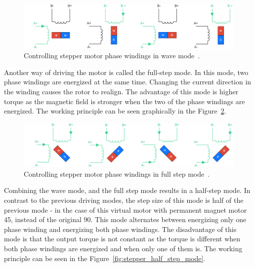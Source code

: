 \begin{figure}[H]
    \centering
    \includegraphics[width=\textwidth]{obrazky/wave_principle}
    \caption{Controlling stepper motor phase windings in wave mode~\cite{carmine_fiore_stepper_2021}.}
    \label{fig:stepper_wave_mode}
\end{figure}

\newpage
Another way of driving the motor is called the full-step mode.
In this mode, two phase windings are energized at the same time.
Changing the current direction in the winding causes the rotor to realign.
The advantage of this mode is higher torque as the magnetic field is stronger when the two of the phase windings are energized.
The working principle can be seen graphically in the Figure~\ref{fig:stepper_full_step_mode}.

\begin{figure}[H]
    \centering
    \includegraphics[width=\textwidth]{obrazky/full_step_principle}
    \caption{Controlling stepper motor phase windings in full step mode~\cite{carmine_fiore_stepper_2021}.}
    \label{fig:stepper_full_step_mode}
\end{figure}

Combining the wave mode, and the full step mode results in a half-step mode.
In contrast to the previous driving modes, the step size of this mode is half of the previous mode - in the case of this virtual motor with permanent magnet motor 45\textdegree, instead of the original 90\textdegree.
This mode alternates between energizing only one phase winding and energizing both phase windings.
The disadvantage of this mode is that the output torque is not constant as the torque is different when both phase windings are energized and when only one of them is.
The working principle can be seen in the Figure~\ref{fig:stepper_half_step_mode}.

